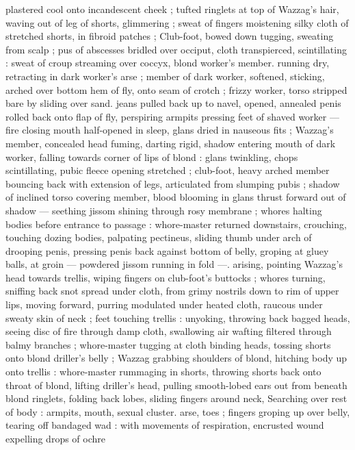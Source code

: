 plastered cool onto incandescent cheek ; tufted ringlets at top of 
Wazzag's hair, waving out of leg of shorts, glimmering ; sweat of 
fingers moistening silky cloth of stretched shorts, in fibroid patches 
; Club-foot, bowed down tugging, sweating from scalp ; pus of 
abscesses bridled over occiput, cloth transpierced, scintillating : 
sweat of croup streaming over coccyx, blond worker's member. 
running dry, retracting in dark worker's arse ; member of dark 
worker, softened, sticking, arched over bottom hem of fly, onto seam 
of crotch ; frizzy worker, torso stripped bare by sliding over sand. 
jeans pulled back up to navel, opened, annealed penis rolled back 
onto flap of fly, perspiring armpits pressing feet of shaved worker --- 
fire closing mouth half-opened in sleep, glans dried in nauseous fits 
; Wazzag's member, concealed head fuming, darting rigid, shadow 
entering mouth of dark worker, falling towards corner of lips of 
blond : glans twinkling, chops scintillating, pubic fleece opening 
stretched ; club-foot, heavy arched member bouncing back with 
extension of legs, articulated from slumping pubis ; shadow of 
inclined torso covering member, blood blooming in glans thrust 
forward out of shadow --- seething jissom shining through rosy 
membrane ; whores halting bodies before entrance to passage : 
whore-master returned downstairs, crouching, touching dozing 
bodies, palpating pectineus, sliding thumb under arch of drooping 
penis, pressing penis back against bottom of belly, groping at gluey 
balls, at groin --- powdered jissom running in fold ---. arising, 
pointing Wazzag's head towards trellis, wiping fingers on club-foot's 
buttocks ; whores turning, sniffing back snot spread under cloth, 
from grimy nostrils down to rim of upper lips, moving forward, 
purring modulated under heated cloth, raucous under sweaty skin of 
neck ; feet touching trellis : unyoking, throwing back bagged heads, 
seeing disc of fire through damp cloth, swallowing air wafting filtered 
through balmy branches ; whore-master tugging at cloth binding 
heads, tossing shorts onto blond driller's belly ; Wazzag grabbing 
shoulders of blond, hitching body up onto trellis : whore-master 
rummaging in shorts, throwing shorts back onto throat of blond, 
lifting driller's head, pulling smooth-lobed ears out from beneath 
blond ringlets, folding back lobes, sliding fingers around neck, 
Searching over rest of body : armpits, mouth, sexual cluster. arse, 
toes ; fingers groping up over belly, tearing off bandaged wad : with 
movements of respiration, encrusted wound expelling drops of ochre 
